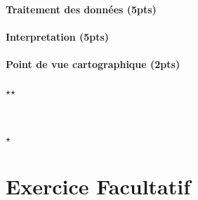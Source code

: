 \paragraph{Traitement des données (5pts)}




\paragraph{Interpretation (5pts)}



\paragraph{Point de vue cartographique (2pts)}












\bigskip
\bigskip

\strut\hfill$\star$\hspace{1.2cm}$\star$\hfill\strut\vspace{0.1cm}\\

\strut\hfill$\star$\hfill\strut\par





\section*{Exercice Facultatif}









